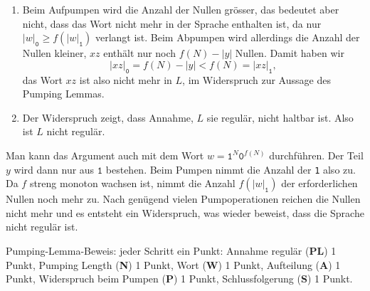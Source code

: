\begin{loesung}
\begin{enumerate}
\begin{center}
\begin{tikzpicture}[>=latex,thick,scale=0.5]
\end{tikzpicture}
\end{center}
\item Beim Aufpumpen wird die Anzahl der Nullen grösser, das bedeutet
aber nicht, dass das Wort nicht mehr in der Sprache enthalten ist,
da nur $|w|_{\texttt{0}} \ge f(|w|_{\texttt{1}})$ verlangt ist.
Beim Abpumpen wird allerdings die Anzahl der Nullen kleiner, $xz$ enthält
nur noch $f(N)-|y|$ Nullen.
Damit haben wir 
\[
|xz|_{\texttt{0}} = f(N)-|y| < f(N) = |xz|_{\texttt{1}},
\]
das Wort $xz$ ist also nicht mehr in $L$, im Widerspruch zur Aussage
des Pumping Lemmas.
\item Der Widerspruch zeigt, dass Annahme, $L$ sie regulär, nicht
haltbar ist.
Also ist $L$ nicht regulär.
\qedhere
\end{enumerate}
\end{loesung}

\begin{diskussion}
Man kann das Argument auch mit dem Wort $w=\texttt{1}^N\texttt{0}^{f(N)}$
durchführen.
Der Teil $y$ wird dann nur  aus $\texttt{1}$ bestehen.
Beim Pumpen nimmt die Anzahl der \texttt{1} also zu.
Da $f$ streng monoton wachsen ist, nimmt die Anzahl $f(|w|_{\texttt{1}})$
der erforderlichen Nullen  noch mehr zu.
Nach genügend vielen Pumpoperationen reichen die Nullen nicht mehr und
es entsteht ein Widerspruch, was wieder beweist, dass die Sprache nicht
regulär ist.
\end{diskussion}

\begin{bewertung}
Pumping-Lemma-Beweis: jeder Schritt ein Punkt:
Annahme regulär ({\bf PL}) 1 Punkt,
Pumping Length ({\bf N}) 1 Punkt,
Wort ({\bf W}) 1 Punkt,
Aufteilung ({\bf A}) 1 Punkt,
Widerspruch beim Pumpen ({\bf P}) 1 Punkt,
Schlussfolgerung ({\bf S}) 1 Punkt.
\end{bewertung}
